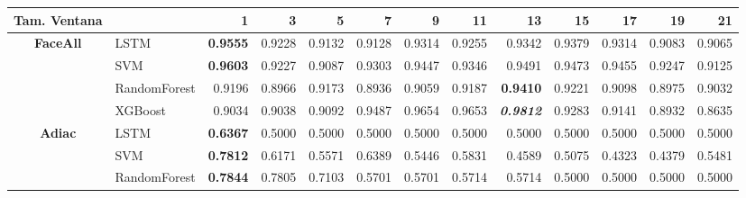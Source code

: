 \begin{table}[H]
	\centering
	\begin{adjustbox}{max width=12cm}
		\begin{tabular}{|c|l|r|r|r|r|r|r|r|r|r|r|r|}
			\hline
			\textbf{Tam. Ventana} &              & 1                        & 3                        & 5               & 7      & 9               & 11                       & 13                       & 15                       & 17     & 19                       & 21              \\
			\hline
			\textbf{FaceAll}      & LSTM         & \textbf{0.9555}          & 0.9228                   & 0.9132          & 0.9128 & 0.9314          & 0.9255                   & 0.9342                   & 0.9379                   & 0.9314 & 0.9083                   & 0.9065          \\
			                      & SVM          & \textbf{0.9603}          & 0.9227                   & 0.9087          & 0.9303 & 0.9447          & 0.9346                   & 0.9491                   & 0.9473                   & 0.9455 & 0.9247                   & 0.9125          \\
			                      & RandomForest & 0.9196                   & 0.8966                   & 0.9173          & 0.8936 & 0.9059          & 0.9187                   & \textbf{0.9410}          & 0.9221                   & 0.9098 & 0.8975                   & 0.9032          \\
			                      & XGBoost      & 0.9034                   & 0.9038                   & 0.9092          & 0.9487 & 0.9654          & 0.9653                   & \textit{\textbf{0.9812}} & 0.9283                   & 0.9141 & 0.8932                   & 0.8635          \\
			\hline
			\textbf{Adiac}        & LSTM         & \textbf{0.6367}          & 0.5000                   & 0.5000          & 0.5000 & 0.5000          & 0.5000                   & 0.5000                   & 0.5000                   & 0.5000 & 0.5000                   & 0.5000          \\
			                      & SVM          & \textbf{0.7812}          & 0.6171                   & 0.5571          & 0.6389 & 0.5446          & 0.5831                   & 0.4589                   & 0.5075                   & 0.4323 & 0.4379                   & 0.5481          \\
			                      & RandomForest & \textbf{0.7844}          & 0.7805                   & 0.7103          & 0.5701 & 0.5701          & 0.5714                   & 0.5714                   & 0.5000                   & 0.5000 & 0.5000                   & 0.5000          \\

\end{tabular}
\end{adjustbox}
\end{table}

